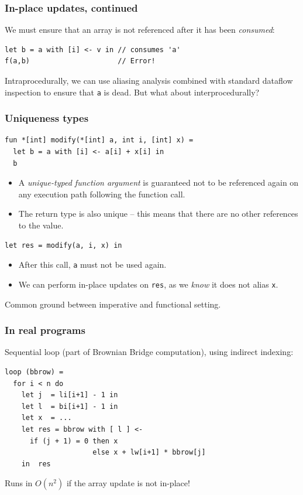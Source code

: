 \documentclass[rgb,dvipsnames]{beamer}
\begin{document}
\begin{frame}[fragile]
  \frametitle{In-place updates, continued}

  We must ensure that an array is not referenced after it has been
  \textit{consumed}:

\begin{lstlisting}
let b = a with [i] <- v in // consumes 'a'
f(a,b)                     // Error!
\end{lstlisting}

  Intraprocedurally, we can use aliasing analysis combined with standard
  dataflow inspection to ensure that \texttt{a} is dead.  But what about
  interprocedurally?

\end{frame}

\begin{frame}[fragile]
  \frametitle{Uniqueness types}

\begin{lstlisting}
fun *[int] modify(*[int] a, int i, [int] x) =
  let b = a with [i] <- a[i] + x[i] in
  b
\end{lstlisting}

  \begin{itemize}
  \item A \textit{unique-typed function argument} is guaranteed not to
    be referenced again on any execution path following the function
    call.

  \item The return type is also unique -- this means that there are no
    other references to the value.
  \end{itemize}
  \pause
\begin{lstlisting}
let res = modify(a, i, x) in
\end{lstlisting}

  \begin{itemize}
  \item After this call, \texttt{a} must not be
    used again.
  \item We can perform in-place updates on \texttt{res}, as we
    \textit{know} it does not alias \texttt{x}.
  \end{itemize}

  Common ground between imperative and functional setting.

\end{frame}

\begin{frame}[fragile]
  \frametitle{In real programs}

  Sequential loop (part of Brownian Bridge computation), using
  indirect indexing:

\begin{lstlisting}
loop (bbrow) =
  for i < n do
    let j  = li[i+1] - 1 in
    let l  = bi[i+1] - 1 in
    let x  = ...
    let res = bbrow with [ l ] <-
      if (j + 1) = 0 then x
                     else x + lw[i+1] * bbrow[j]
    in  res
\end{lstlisting}

\begin{mdframed}
  Runs in $O(n^{2})$ if the array update is not in-place!
\end{mdframed}
\end{frame}
\end{document}
